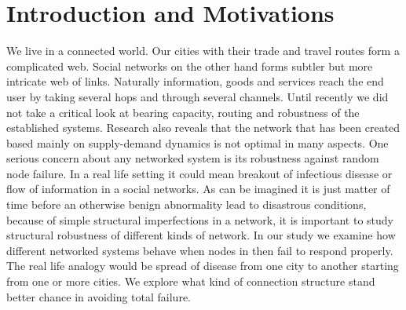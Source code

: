 \documentclass[11pt]{article}
\begin{document}
\section{Introduction and Motivations}
We live in a connected world. Our cities with their trade and travel routes form a complicated web. Social networks on the other hand forms subtler but more intricate web of links. Naturally information, goods and services reach the end user by taking several hops and through several channels. Until recently we did not take a critical look at bearing capacity, routing and robustness of the established systems. Research also reveals that the network that has been created based mainly on supply-demand dynamics is not optimal in many aspects. One serious concern about any networked system is its robustness against random node failure. In a real life setting it could mean breakout of infectious disease or flow of information in a social networks. As can be imagined it is just matter of time before an otherwise benign abnormality lead to disastrous conditions, because of simple structural imperfections in a network, it is important to study structural robustness of different kinds of network. In our study we examine how different networked systems behave when nodes in then fail to respond properly. The real life analogy would be spread of disease from one city to another starting from one or more cities. We explore what kind of connection structure stand better chance in avoiding total failure.
\end{document}
